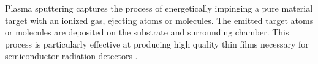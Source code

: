 \documentclass[../../../main.tex]{subfiles}
\begin{document}
%
    \Xsubsection%
    Plasma sputtering captures the process of energetically impinging a pure material target with an ionized gas, ejecting atoms or molecules.
    The emitted target atoms or molecules are deposited on the substrate and surrounding chamber.
    This process is particularly effective at producing high quality thin films necessary for semiconductor radiation detectors \cite{book:Ohring_2001, book:OHanlon_2005}.
\end{document}
